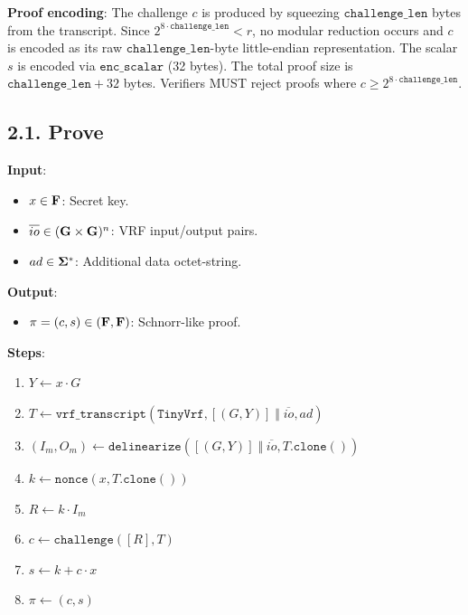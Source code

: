 \documentclass[
]{article}
\providecommand{\tightlist}{%
  \setlength{\itemsep}{0pt}\setlength{\parskip}{0pt}}
\begin{document}
\textbf{Proof encoding}: The challenge \(c\) is produced by squeezing
\(\texttt{challenge\_len}\) bytes from the transcript. Since
\(2^{8 \cdot \texttt{challenge\_len}} < r\), no modular reduction occurs
and \(c\) is encoded as its raw \(\texttt{challenge\_len}\)-byte
little-endian representation. The scalar \(s\) is encoded via
\(\texttt{enc\_scalar}\) (32 bytes). The total proof size is
\(\texttt{challenge\_len} + 32\) bytes. Verifiers MUST reject proofs
where \(c \geq 2^{8 \cdot \texttt{challenge\_len}}\).

\subsection{2.1. Prove}\label{prove}

\textbf{Input}:

\begin{itemize}
\tightlist
\item
  \(x \in \bold{F}\): Secret key.
\item
  \(\overline{io} \in (\bold{G}\times \bold{G})^n\): VRF input/output
  pairs.
\item
  \(ad \in \bold{\Sigma}^*\): Additional data octet-string.
\end{itemize}

\textbf{Output}:

\begin{itemize}
\tightlist
\item
  \(\pi = (c, s) \in (\bold{F}, \bold{F})\): Schnorr-like proof.
\end{itemize}

\textbf{Steps}:

\begin{enumerate}
\def\labelenumi{\arabic{enumi}.}
\tightlist
\item
  \(Y \gets x \cdot G\)
\item
  \(T \gets \texttt{vrf\_transcript}(\texttt{TinyVrf}, [(G, Y)] \;\Vert\; \overline{io}, ad)\)
\item
  \((I_m, O_m) \gets \texttt{delinearize}([(G, Y)] \;\Vert\; \overline{io}, T.\texttt{clone}())\)
\item
  \(k \gets \texttt{nonce}(x, T.\texttt{clone}())\)
\item
  \(R \gets k \cdot I_m\)
\item
  \(c \gets \texttt{challenge}([R], T)\)
\item
  \(s \gets k + c \cdot x\)
\item
  \(\pi \gets (c, s)\)
\end{enumerate}
\end{document}
